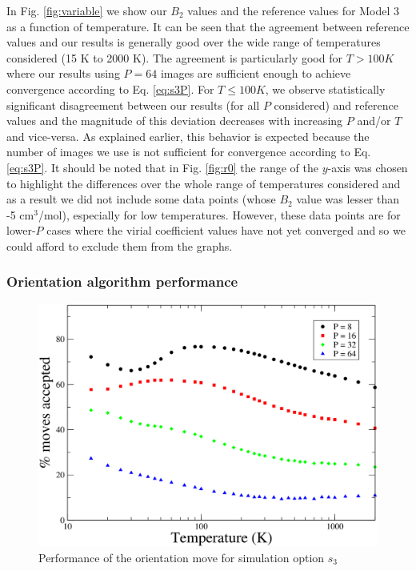                In Fig. \ref{fig:variable} we show our $B_2$ values and the reference values for Model 3 as a function of temperature. It can be seen that the agreement between reference values and our results is generally good over the wide range of temperatures considered (15 K to 2000 K). The agreement is particularly good for $T > 100 K$ where our results using $P = 64$ images are sufficient enough to achieve convergence according to Eq. \eqref{eq:s3P}. For $T \le 100 K$, we observe statistically significant disagreement between our results (for all $P$ considered) and reference values and the magnitude of this deviation decreases with increasing $P$ and/or $T$ and vice-versa. As explained earlier, this behavior is expected because the number of images we use is not sufficient for convergence according to Eq. \eqref{eq:s3P}. It should be noted that in Fig. \ref{fig:r0} the range of the $y$-axis was chosen to highlight the differences over the whole range of temperatures considered and as a result we did not include some data points (whose $B_2$ value was lesser than -5 cm$^3$/mol), especially for low temperatures. However, these data points are for lower-$P$ cases where the virial coefficient values have not yet converged and so we could afford to exclude them from the graphs.

            \subsubsection{Orientation algorithm performance}
                \begin{figure}[!htbp]
                    \centering
                    \includegraphics[scale=0.20,keepaspectratio]{Chapter-4/Figures/s3OrAcc.png}
                    \caption{Performance of the orientation move for simulation option $s_3$}
                    \label{fig:variableOrAcc}
                \end{figure}

